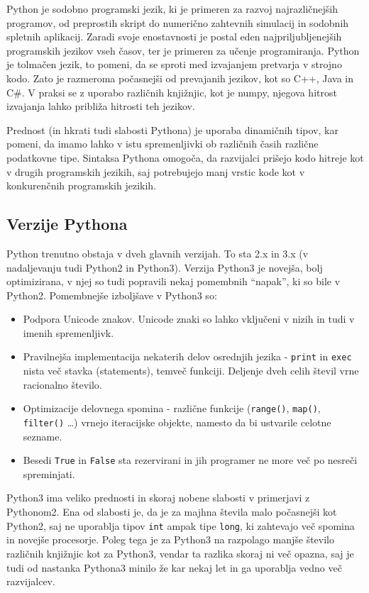 Python je sodobno programski jezik, ki je primeren za razvoj najrazličnejših programov, od preprostih skript do numerično zahtevnih simulacij in sodobnih spletnih aplikacij. Zaradi svoje enostavnosti je postal eden najpriljubljenejših programskih jezikov vseh časov, ter je primeren za učenje programiranja. Python je tolmačen jezik, to pomeni, da se sproti med izvajanjem pretvarja v strojno kodo.\cite{rin} Zato je razmeroma počasnejši od prevajanih jezikov, kot so C++, Java in C\#. V praksi se z uporabo različnih knjižnjic, kot je numpy, njegova hitrost izvajanja lahko približa hitrosti teh jezikov.

    Prednost (in hkrati tudi slabosti Pythona) je uporaba dinamičnih tipov, kar pomeni, da imamo lahko v istu spremenljivki ob različnih časih različne podatkovne tipe. Sintaksa Pythona omogoča, da razvijalci prišejo kodo hitreje kot v drugih programskih jezikih, saj potrebujejo manj vrstic kode kot v konkurenčnih programskih jezikih.

    \subsection{Verzije Pythona}
        Python trenutno obstaja v dveh glavnih verzijah. To sta 2.x in 3.x (v nadaljevanju tudi Python2 in Python3). Verzija Python3 je novejša, bolj optimizirana, v njej so tudi popravili nekaj pomembnih ``napak'', ki so bile v Python2. Pomembnejše izboljšave v Python3 so:
        \begin{itemize}
            \item Podpora Unicode znakov. Unicode znaki so lahko vključeni v nizih in tudi v imenih spremenljivk.
            \item Pravilnejša implementacija nekaterih delov osrednjih jezika - \texttt{print} in \texttt{exec} nista več stavka (statements), temveč funkciji. Deljenje dveh celih števil vrne racionalno število.
            \item Optimizacije delovnega spomina - različne funkcije (\texttt{range()}, \texttt{map()}, \texttt{filter()} \ldots) vrnejo iteracijske objekte, namesto da bi ustvarile celotne sezname.
            \item Besedi \texttt{True} in \texttt{False} sta rezervirani in jih programer ne more več po nesreči spreminjati.
        \end{itemize}

        Python3 ima veliko prednosti in skoraj nobene slabosti v primerjavi z Pythonom2. Ena od slabosti je, da je za majhna števila malo počasnejši kot Python2, saj ne uporablja tipov \texttt{int} ampak tipe \texttt{long}, ki zahtevajo več spomina in novejše procesorje. Poleg tega je za Python3 na razpolago manjše število različnih knjižnjic kot za Python3, vendar ta razlika skoraj ni več opazna, saj je tudi od nastanka Pythona3 minilo že kar nekaj let in ga uporablja vedno več razvijalcev.

